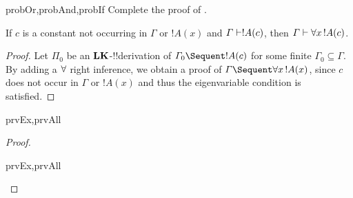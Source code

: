 \documentclass[../../include/open-logic-section]{subfiles}
\begin{document}
\begin{probtag}{probOr,probAnd,probIf}
Complete the proof of .
\end{probtag}

\begin{thm}
 If $c$ is a constant not occurring
in $\Gamma$ or $!A(x)$ and $\Gamma \Proves !A(c)$, then $\Gamma
\Proves \lforall[x][!A(c)]$.
\end{thm}

\begin{proof}
Let $\Pi_0$ be an $\mathbf{LK}$-!!{derivation} of $\Gamma_0 \Sequent !A(c)$
for some finite $\Gamma_0 \subseteq \Gamma$.  By adding a $\lforall$
right inference, we obtain a proof of $\Gamma \Sequent
\lforall[x][!A(x)]$, since $c$ does not occur in $\Gamma$ or $!A(x)$
and thus the eigenvariable condition is satisfied.
\end{proof}

\begin{thm}
\begin{tagenumerate}{prvEx,prvAll}

\end{tagenumerate}
\end{thm}

\begin{proof}
\begin{tagenumerate}{prvEx,prvAll}

\end{tagenumerate}
\end{proof}
\end{document}
